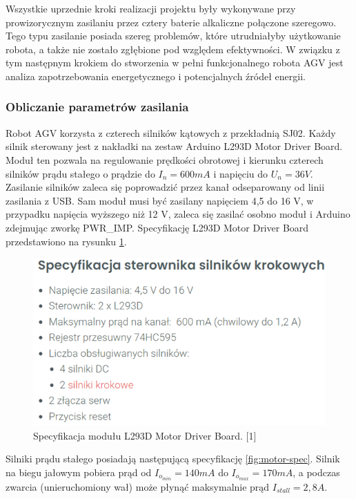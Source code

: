 \documentclass{report}
\begin{document}
Wszystkie uprzednie kroki realizacji projektu były wykonywane przy prowizorycznym zasilaniu przez cztery baterie alkaliczne połączone szeregowo. Tego typu zasilanie posiada szereg problemów, które utrudniałyby użytkowanie robota, a także nie zostało zgłębione pod względem efektywności. W związku z tym następnym krokiem do stworzenia w pełni funkcjonalnego robota AGV jest analiza zapotrzebowania energetycznego i potencjalnych źródeł energii.

\subsubsection{\large Obliczanie parametrów zasilania}

Robot AGV korzysta z czterech silników kątowych z przekładnią SJ02. Każdy silnik sterowany jest z nakładki na zestaw Arduino L293D Motor Driver Board. Moduł ten pozwala na regulowanie prędkości obrotowej i kierunku czterech silników prądu stałego o prądzie do $I_n=600 mA$ i napięciu do $U_n=36 V$. Zasilanie silników zaleca się poprowadzić przez kanał odseparowany od linii zasilania z USB. Sam moduł musi być zasilany napięciem 4,5 do 16 V, w przypadku napięcia wyższego niż 12 V, zaleca się zasilać osobno moduł i Arduino zdejmując zworkę PWR\_IMP. Specyfikację L293D Motor Driver Board przedstawiono na rysunku \ref{fig:motor-driver-spec}.

\begin{figure}[H]
    \centering
    \includegraphics{src/tech_specifications/L293D Motor Driver Board.png}
    \caption{Specyfikacja modułu L293D Motor Driver Board. [1]}
    \label{fig:motor-driver-spec}
\end{figure}

Silniki prądu stałego posiadają następującą specyfikację \ref{fig:motor-spec}. Silnik na biegu jałowym 
pobiera prąd od $I_{o_{min}}=140 mA$ do $I_{o_{max}}=170 mA$, a podczas zwarcia (unieruchomiony wał) może płynąć maksymalnie prąd $I_{stall}=2,8 A$.
\end{document}
